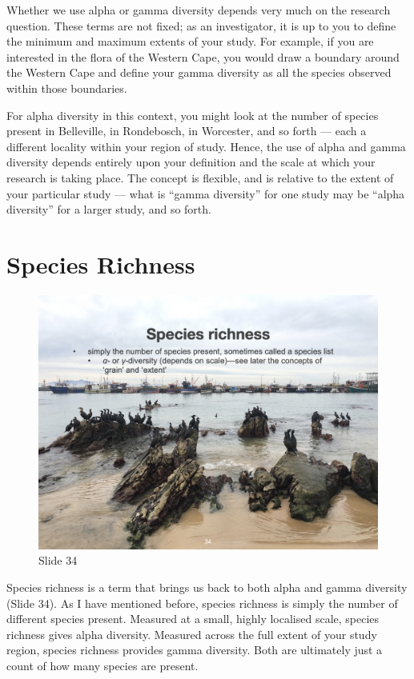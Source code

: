 \documentclass[
  10pt,
]{book}
\begin{document}
Whether we use alpha or gamma diversity depends very much on the
research question. These terms are not fixed; as an investigator, it is
up to you to define the minimum and maximum extents of your study. For
example, if you are interested in the flora of the Western Cape, you
would draw a boundary around the Western Cape and define your gamma
diversity as all the species observed within those boundaries.

For alpha diversity in this context, you might look at the number of
species present in Belleville, in Rondebosch, in Worcester, and so forth
--- each a different locality within your region of study. Hence, the
use of alpha and gamma diversity depends entirely upon your definition
and the scale at which your research is taking place. The concept is
flexible, and is relative to the extent of your particular study ---
what is ``gamma diversity'' for one study may be ``alpha diversity'' for
a larger study, and so forth.

\section{Species Richness}\label{species-richness}

\begin{figure}[ht]
\centering
\includegraphics[width=0.8\linewidth]{../images/BDC334/BDC334-034.jpeg}
\caption*{Slide 34}
\end{figure}

Species richness is a term that brings us back to both alpha and gamma
diversity (Slide 34). As I have mentioned before, species richness is
simply the number of different species present. Measured at a small,
highly localised scale, species richness gives alpha diversity. Measured
across the full extent of your study region, species richness provides
gamma diversity. Both are ultimately just a count of how many species
are present.
\end{document}
